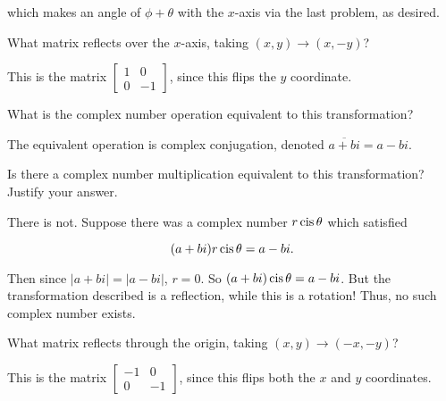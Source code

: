 \documentclass[../key.tex]{subfiles}
\begin{document}
which makes an angle of $\phi + \theta$ with the $x$-axis via the last problem, as desired.

\begin{outer_problem}
\item
\end{outer_problem}

\begin{inner_problem}[start=1]
\item What matrix reflects over the $x$-axis, taking $(x,y)\to (x,-y)$?
\end{inner_problem}

This is the matrix $\begin{bmatrix} 1 & 0 \\ 0 & -1 \end{bmatrix}$, since this flips the $y$ coordinate.

\begin{inner_problem}
\item What is the complex number operation equivalent to this transformation?
\end{inner_problem}

The equivalent operation is complex conjugation, denoted $\overline{a+bi} = a-bi$.

\begin{inner_problem}
\item Is there a complex number multiplication equivalent to this transformation? Justify your answer.
\end{inner_problem}

There is not. Suppose there was a complex number $r\operatorname{cis}\theta$ which satisfied

$$(a+bi)r\operatorname{cis}\theta = a-bi.$$

Then since $|a+bi| = |a-bi|$, $r=0$. So $(a+bi)\operatorname{cis}\theta = a-bi$. But the transformation described is a reflection, while this is a rotation! Thus, no such complex number exists.

\begin{outer_problem}
\item
\end{outer_problem}

\begin{inner_problem}[start=1]
\item What matrix reflects through the origin, taking $(x,y)\to (-x,-y)$?
\end{inner_problem}

This is the matrix $\begin{bmatrix} -1 & 0 \\ 0 & -1 \end{bmatrix}$, since this flips both the $x$ and $y$ coordinates.
\end{document}
